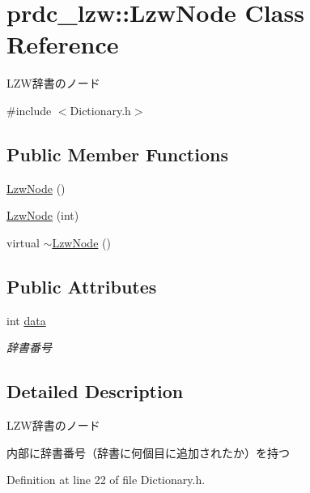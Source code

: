 \hypertarget{classprdc__lzw_1_1LzwNode}{\section{prdc\-\_\-lzw\-:\-:Lzw\-Node Class Reference}
\label{classprdc__lzw_1_1LzwNode}
}


L\-Z\-W辞書のノード  




{\ttfamily \#include $<$Dictionary.\-h$>$}

\subsection*{Public Member Functions}
\begin{DoxyCompactItemize}
\item 
\hyperlink{classprdc__lzw_1_1LzwNode_aecd8429cfcb52da0c5a88c2eb2ce8f17}{Lzw\-Node} ()
\item 
\hyperlink{classprdc__lzw_1_1LzwNode_a526085827e4c1f779a0bd7493c67c8c5}{Lzw\-Node} (int)
\item 
virtual \hyperlink{classprdc__lzw_1_1LzwNode_ab7c9e93839328025287d465734dfba4a}{$\sim$\-Lzw\-Node} ()
\end{DoxyCompactItemize}
\subsection*{Public Attributes}
\begin{DoxyCompactItemize}
\item 
int \hyperlink{classprdc__lzw_1_1LzwNode_ac85178681ea1181b22c3ac43af32515a}{data}
\begin{DoxyCompactList}\small\item\em 辞書番号 \end{DoxyCompactList}\end{DoxyCompactItemize}


\subsection{Detailed Description}
L\-Z\-W辞書のノード 

内部に辞書番号（辞書に何個目に追加されたか）を持つ 

Definition at line 22 of file Dictionary.\-h.



